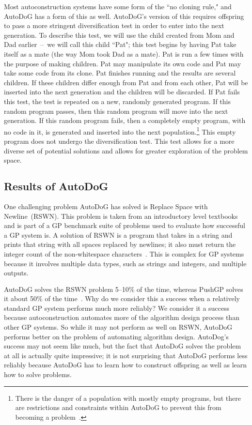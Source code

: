 \documentclass{sig-alternate}
\begin{document}
Most autoconstruction systems have some form of the ``no cloning rule," and AutoDoG has a form of this as well. AutoDoG's version of this requires offspring to pass a more stringent diversification test in order to enter into the next generation. To describe this test, we will use the child created from Mom and Dad earlier~--~we will call this child ``Pat"; this test begins by having Pat take itself as a mate (the way Mom took Dad as a mate). Pat is run a few times with the purpose of making children. Pat may manipulate its own code and Pat may take some code from its clone. Pat finishes running and the results are several children. If these children differ enough from Pat and from each other, Pat will be inserted into the next generation and the children will be discarded. If Pat fails this test, the test is repeated on a new, randomly generated program. If this random program passes, then this random program will move into the next generation. If this random program fails, then a completely empty program, with no code in it, is generated and inserted into the next population.\footnote{There is the danger of a population with mostly empty programs, but there are restrictions and constraints within AutoDoG to prevent this from becoming a problem~\cite{spector:2016}.} This empty program does not undergo the diversification test.
This test allows for a more diverse set of potential solutions and allows for greater exploration of the problem space.

\subsection{Results of AutoDoG}
\label{sec:results}

One challenging problem AutoDoG has solved is Replace Space with Newline~(RSWN). This problem is taken from an introductory level textbooks and is part of a GP benchmark suite of problems used to evaluate how successful a GP system is. A solution of RSWN is a program that takes in a string and prints that string with all spaces replaced by newlines; it also must return the integer count of the non-whitespace characters~\cite{helmuth:2015}. This is complex for GP systems because it involves multiple data types, such as strings and integers, and multiple outputs.

AutoDoG solves the RSWN problem 5--10\% of the time, whereas PushGP solves it about 50\% of the time~\cite{helmuth:2015}. Why do we consider this a success when a relatively standard GP system performs much more reliably? We consider it a success because autoconstruction automates more of the algorithm design process than other GP systems. So while it may not perform as well on RSWN, AutoDoG performs better on the problem of automating algorithm design. AutoDog's success may not seem like much, but the fact that AutoDoG solves the problem at all is actually quite impressive; it is not surprising that AutoDoG performs less reliably because AutoDoG has to learn how to construct offspring as well as learn how to solve problems.
\end{document}
